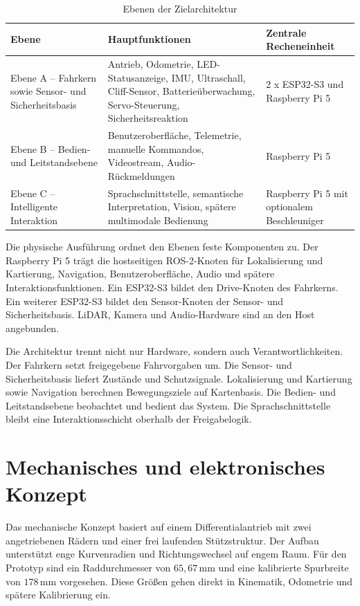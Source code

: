 \begin{table}[htbp]
  \centering
  \caption{Ebenen der Zielarchitektur}
  \small
  \begin{tabularx}{\textwidth}{l L L}
    \toprule
    \textbf{Ebene} & \textbf{Hauptfunktionen} & \textbf{Zentrale Recheneinheit} \\
    \midrule
    Ebene A – Fahrkern sowie Sensor- und Sicherheitsbasis & Antrieb, Odometrie, LED-Statusanzeige, IMU, Ultraschall, Cliff-Sensor, Batterieüberwachung, Servo-Steuerung, Sicherheitsreaktion & 2 x ESP32-S3 und Raspberry Pi 5 \\
    \addlinespace
    Ebene B – Bedien- und Leitstandsebene & Benutzeroberfläche, Telemetrie, manuelle Kommandos, Videostream, Audio-Rückmeldungen & Raspberry Pi 5 \\
    \addlinespace
    Ebene C – Intelligente Interaktion & Sprachschnittstelle, semantische Interpretation, Vision, spätere multimodale Bedienung & Raspberry Pi 5 mit optionalem Beschleuniger \\
    \bottomrule
  \end{tabularx}
\end{table}

Die physische Ausführung ordnet den Ebenen feste Komponenten zu. Der Raspberry Pi 5 trägt die hostseitigen ROS-2-Knoten für Lokalisierung und Kartierung, Navigation, Benutzeroberfläche, Audio und spätere Interaktionsfunktionen. Ein ESP32-S3 bildet den Drive-Knoten des Fahrkerns. Ein weiterer ESP32-S3 bildet den Sensor-Knoten der Sensor- und Sicherheitsbasis. LiDAR, Kamera und Audio-Hardware sind an den Host angebunden.

Die Architektur trennt nicht nur Hardware, sondern auch Verantwortlichkeiten. Der Fahrkern setzt freigegebene Fahrvorgaben um. Die Sensor- und Sicherheitsbasis liefert Zustände und Schutzsignale. Lokalisierung und Kartierung sowie Navigation berechnen Bewegungsziele auf Kartenbasis. Die Bedien- und Leitstandsebene beobachtet und bedient das System. Die Sprachschnittstelle bleibt eine Interaktionsschicht oberhalb der Freigabelogik.

\section{Mechanisches und elektronisches Konzept}

Das mechanische Konzept basiert auf einem Differentialantrieb mit zwei angetriebenen Rädern und einer frei laufenden Stützstruktur. Der Aufbau unterstützt enge Kurvenradien und Richtungswechsel auf engem Raum. Für den Prototyp sind ein Raddurchmesser von $65{,}67\,\mathrm{mm}$ und eine kalibrierte Spurbreite von $178\,\mathrm{mm}$ vorgesehen. Diese Größen gehen direkt in Kinematik, Odometrie und spätere Kalibrierung ein.

